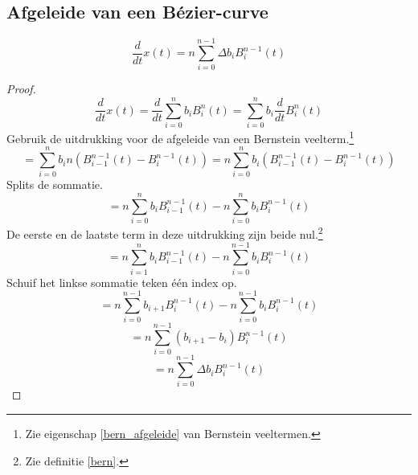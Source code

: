 \documentclass[computergesteund_ontwerp_van_curven_en_oppervlakken.tex]{subfiles}
\begin{document}
\subsection{Afgeleide van een B\'ezier-curve}
\begin{st}
\[
\frac{d}{dt}x(t) = n\sum_{i=0}^{n-1}\Delta b_iB_{i}^{n-1}(t)
\]

\begin{proof}
\[
\frac{d}{dt}x(t)
= \frac{d}{dt}\sum_{i=0}^{n}b_iB_{i}^{n}(t)
= \sum_{i=0}^{n}b_i\frac{d}{dt}B_{i}^{n}(t)
\]
Gebruik de uitdrukking voor de afgeleide van een Bernstein veelterm.\footnote{Zie eigenschap \ref{bern_afgeleide} van Bernstein veeltermen.}
\[
= \sum_{i=0}^{n}b_i n(B_{i-1}^{n-1}(t) - B_{i}^{n-1}(t))
= n\sum_{i=0}^{n}b_i (B_{i-1}^{n-1}(t) - B_{i}^{n-1}(t))
\]
Splits de sommatie.
\[
= n\sum_{i=0}^{n}b_i B_{i-1}^{n-1}(t)
- n\sum_{i=0}^{n}b_i B_{i}^{n-1}(t)
\]
De eerste en de laatste term in deze uitdrukking zijn beide nul.\footnote{Zie definitie \ref{bern}.}
\[
= n\sum_{i=1}^{n}b_i B_{i-1}^{n-1}(t)
- n\sum_{i=0}^{n-1}b_i B_{i}^{n-1}(t)
\]
Schuif het linkse sommatie teken \'e\'en index op.
\[
= n\sum_{i=0}^{n-1}b_{i+1} B_{i}^{n-1}(t)
- n\sum_{i=0}^{n-1}b_i B_{i}^{n-1}(t)
\]
\[
= n\sum_{i=0}^{n-1}(b_{i+1}-b_i)B_{i}^{n-1}(t) 
\]
\[
= n\sum_{i=0}^{n-1}\Delta b_iB_{i}^{n-1}(t)
\]
\end{proof}
\end{st}
\end{document}
